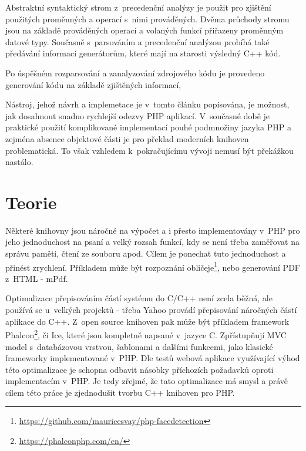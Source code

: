 \documentclass[czech]{ExcelAtFIT}
\begin{document}

		Abstraktní syntaktický strom z~precedenční a\-na\-lý\-zy je použit pro zjištění použitých proměnných a operací s~nimi prováděných. Dvěma průchody stromu jsou na základě prováděných operací a volaných funkcí přiřazeny proměnným datové typy. Současně s~par\-so\-vá\-ním a precedenční analýzou probíhá také předávání informací generátorům, které mají na starosti výsledný C++ kód.

		Po úspěšném rozparsování a zanalyzování zdrojového kódu je provedeno generování kódu na základě zjištěných informací,


		Nástroj, jehož návrh a implemetace je v~tomto článku popisována, je možnost, jak dosahnout snadno rychlejší odezvy PHP aplikací. V~současné době je praktické použití komplikované implementací pouhé podmnožiny jazyka PHP a zejména absence objektové části je pro překlad moderních knihoven problematická. To však vzhledem k~pokračujícímu vývoji nemusí být překážkou nastálo.






\section{Teorie}

	Některé knihovny jsou náročné na výpočet a i přesto implementovány v~PHP pro jeho jednoduchost na psaní a velký rozsah funkcí, kdy se není třeba zaměřovat na správu paměti, čtení ze souboru apod. Cílem je ponechat tuto jednoduchost a přinést zrychlení. Pří\-kla\-dem může být rozpoznání obličeje\footnote{\url{https://github.com/mauricesvay/php-facedetection}}, nebo generování PDF z~HTML - mPdf.

	Optimalizace přepisováním částí systému do C/C++ není zcela běžná, ale používá se u~velkých projektů - třeba Yahoo provádí přepisování náročných částí aplikace do C++\cite{yahooCpp}. Z~open source knihoven pak může být příkladem framework Phalcon\footnote{\url{https://phalconphp.com/en/}}, či Ice, které jsou kompletně napsané v~jazyce C. Zpřístupňují MVC model s~databázovou vrstvou, šablonami a dalšími funkcemi, jako klasické frameworky implementované v~PHP. Dle testů\cite{phalconBenchmark} webová aplikace využívající výhod této optimalizace je schopna odbavit násobky pří\-cho\-zích požadavků oproti implementacím v~PHP. Je tedy zřejmé, že tato optimalizace má smysl a právě cílem této práce je zjednodušit tvorbu C++ knihoven pro PHP.
\end{document}
